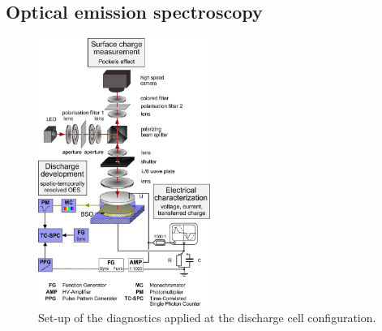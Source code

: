 \documentclass[a4paper,10pt]{article}
\begin{document}
		\subsection{Optical emission spectroscopy}
		
				\begin{figure}
					\centering
					\includegraphics[width=0.5\textwidth]{figures/experimentalsetup/diagnostic_setup.jpg}
					\caption{Set-up of the diagnostics applied at the discharge cell configuration.}
					\label{img:diag}
				\end{figure}
		
\end{document}
